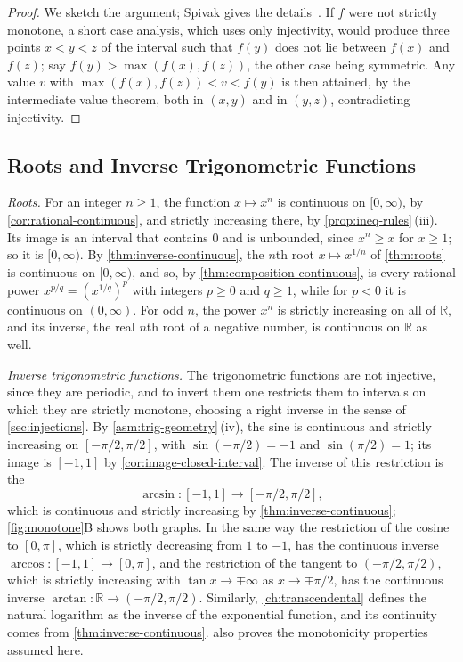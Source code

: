 \begin{proof}
We sketch the argument; Spivak gives the details~\cite{spivak2008calculus}. If $f$ were not strictly monotone, a short case analysis, which uses only injectivity, would produce three points $x<y<z$ of the interval such that $f(y)$ does not lie between $f(x)$ and $f(z)$; say $f(y)>\max(f(x),f(z))$, the other case being symmetric. Any value $v$ with $\max(f(x),f(z))<v<f(y)$ is then attained, by the intermediate value theorem, both in $(x,y)$ and in $(y,z)$, contradicting injectivity.
\end{proof}

\subsection{Roots and Inverse Trigonometric Functions}

\emph{Roots.} For an integer $n\ge1$, the function $x\mapsto x^n$ is continuous on $[0,\infty)$, by \cref{cor:rational-continuous}, and strictly increasing there, by \cref{prop:ineq-rules}\,(iii). Its image is an interval that contains $0$ and is unbounded, since $x^n\ge x$ for $x\ge1$; so it is $[0,\infty)$. By \cref{thm:inverse-continuous}, the $n$th root $x\mapsto x^{1/n}$ of \cref{thm:roots} is continuous on $[0,\infty)$, and so, by \cref{thm:composition-continuous}, is every rational power $x^{p/q}=(x^{1/q})^p$ with integers $p\ge0$ and $q\ge1$, while for $p<0$ it is continuous on $(0,\infty)$. For odd $n$, the power $x^n$ is strictly increasing on all of $\mathbb R$, and its inverse, the real $n$th root of a negative number, is continuous on $\mathbb R$ as well.

\emph{Inverse trigonometric functions.} The trigonometric functions are not injective, since they are periodic, and to invert them one restricts them to intervals on which they are strictly monotone, choosing a right inverse in the sense of \cref{sec:injections}. By \cref{asm:trig-geometry}\,(iv), the sine is continuous and strictly increasing on $[-\pi/2,\pi/2]$, with $\sin(-\pi/2)=-1$ and $\sin(\pi/2)=1$; its image is $[-1,1]$ by \cref{cor:image-closed-interval}. The inverse of this restriction is the 
\[
\arcsin\colon[-1,1]\to[-\pi/2,\pi/2],
\]
which is continuous and strictly increasing by \cref{thm:inverse-continuous}; \cref{fig:monotone}B shows both graphs. In the same way the restriction of the cosine to $[0,\pi]$, which is strictly decreasing from $1$ to $-1$, has the continuous inverse $\arccos\colon[-1,1]\to[0,\pi]$, and the restriction of the tangent to $(-\pi/2,\pi/2)$, which is strictly increasing with $\tan x\to\mp\infty$ as $x\to\mp\pi/2$, has the continuous inverse $\arctan\colon\mathbb R\to(-\pi/2,\pi/2)$. Similarly, \cref{ch:transcendental} defines the natural logarithm as the inverse of the exponential function, and its continuity comes from \cref{thm:inverse-continuous}.  also proves the monotonicity properties assumed here.

